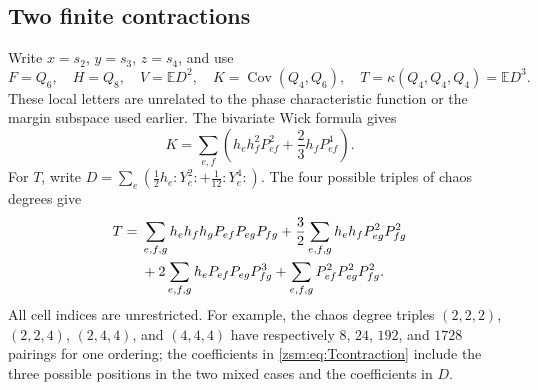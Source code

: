 \documentclass[11pt]{article}
\theoremstyle{definition}\newtheorem{definition}[theorem]{Definition}
\theoremstyle{remark}\newtheorem{remark}[theorem]{Remark}
\newcommand{\E}{\mathbb E}
\newcommand{\Cov}{\operatorname{Cov}}
\begin{document}
\subsection{Two finite contractions}
Write $x=s_2$, $y=s_3$, $z=s_4$, and use
\[
 F=Q_6,\quad H=Q_8,\quad V=\E D^2,\quad
 K=\Cov(Q_4,Q_6),\quad T=\kappa(Q_4,Q_4,Q_4)=\E D^3.
\]
These local letters are unrelated to the phase characteristic function or the
margin subspace used earlier. The bivariate Wick formula gives
\begin{equation}\label{zsm:eq:Kcontraction}
 K=\sum_{e,f}\left(h_eh_f^2P_{ef}^2+\frac23h_fP_{ef}^4\right).
\end{equation}
For $T$, write
$D=\sum_e(\tfrac12h_e:Y_e^2:+\tfrac1{12}:Y_e^4:)$.
The four possible triples of chaos degrees give
\begin{align}
 T={}&\sum_{e,f,g}h_eh_fh_gP_{ef}P_{eg}P_{fg}
 +\frac32\sum_{e,f,g}h_eh_fP_{eg}^2P_{fg}^2\notag\\
 &+2\sum_{e,f,g}h_eP_{ef}P_{eg}P_{fg}^3
 +\sum_{e,f,g}P_{ef}^2P_{eg}^2P_{fg}^2.\label{zsm:eq:Tcontraction}
\end{align}
All cell indices are unrestricted. For example, the chaos degree triples
$(2,2,2)$, $(2,2,4)$, $(2,4,4)$, and $(4,4,4)$ have respectively
$8$, $24$, $192$, and $1728$ pairings for one ordering; the coefficients in
\eqref{zsm:eq:Tcontraction} include the three possible positions in the two mixed
cases and the coefficients in $D$.
\end{document}
